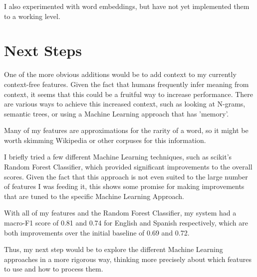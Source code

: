 \documentclass[11pt]{article}
\begin{document}
I also experimented with word embeddings, but have not yet implemented them to a working level.

\section{Next Steps}

One of the more obvious additions would be to add context to my currently context-free features. Given the fact that humans frequently infer meaning from context, it seems that this could be a fruitful way to increase performance. There are various ways to achieve this increased context, such as looking at N-grams, semantic trees, or using a Machine Learning approach that has 'memory'.


Many of my features are approximations for the rarity of a word, so it might be worth skimming Wikipedia or other corpuses for this information.


I briefly tried a few different Machine Learning techniques, such as scikit's Random Forest Classifier, which provided significant improvements to the overall scores. Given the fact that this approach is not even suited to the large number of features I was feeding it, this shows some promise for making improvements that are tuned to the specific Machine Learning Approach. 

With all of my features and the Random Forest Classifier, my system had a macro-F1 score of 0.81 and 0.74 for English and Spanish respectively, which are both improvements over the initial baseline of 0.69 and 0.72.

Thus, my next step would be to explore the different Machine Learning approaches in a more rigorous way, thinking more precisely about which features to use and how to process them.
\end{document}
